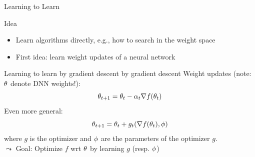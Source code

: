 \begin{frame}[c]{Learning to Learn}

\begin{block}{Idea}
\begin{itemize}
	\item Learn algorithms directly, e.g., how to search in the weight space
	\item First idea: learn weight updates of a neural network
\end{itemize}
\end{block}

\pause

\begin{block}{Learning to learn by gradient descent by gradient descent\newline {}}
Weight updates (note: \alert{$\theta$ denote DNN weights!}):
\begin{equation}
\theta_{t+1} = \theta_t - \alpha_t \nabla f(\theta_t) \nonumber
\end{equation}
\pause
Even more general:
\begin{equation}
\theta_{t+1} = \theta_t + g_t(\nabla f(\theta_t), \phi) \nonumber
\end{equation}
where $g$ is the optimizer and $\phi$ are the parameters of the optimizer $g$.\\
\pause
$\leadsto$ \alert{Goal: Optimize $f$ wrt $\theta$ by learning $g$ (resp. $\phi$)}
\end{block}

\end{frame}
